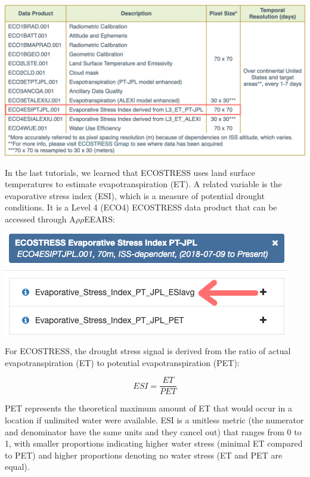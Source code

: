 \documentclass[oneside,a4paper,11pt,explicit]{book}
\begin{document}
\vspace{.5em}

\centerline{\includegraphics[width=.75\textwidth]{ECOSTRESS_DataProducts.png}}

\vspace{.5em}

In the last tutorials, we learned that ECOSTRESS uses land surface temperatures to estimate evapotranspiration (ET). A related variable is the evaporative stress index (ESI), which is a measure of potential drought conditions. It is a Level 4 (ECO4) ECOSTRESS data product that can be accessed through A$\rho\rho$EEARS:

\vspace{.5em}

\centerline{\includegraphics[width=.6\textwidth]{ESIecostress.png}}

\vspace{.5em}

For ECOSTRESS, the drought stress signal is derived from the ratio of actual evapotranspiration (ET) to potential evapotranspiration (PET):

\[
	ESI = \frac{ET}{PET}
\]

PET represents the theoretical maximum amount of ET that would occur in a location if unlimited water were available. ESI is a unitless metric (the numerator and denominator have the same units and they cancel out) that ranges from 0 to 1, with smaller proportions indicating higher water stress (minimal ET compared to PET) and higher proportions denoting no water stress (ET and PET are equal). 

\end{document}
